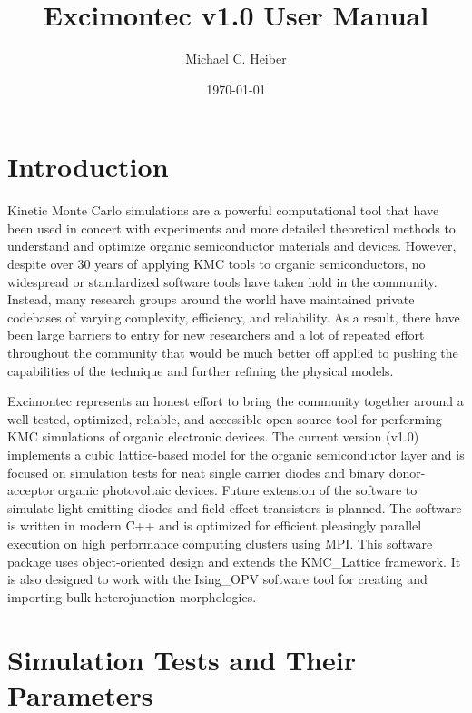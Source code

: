 \documentclass[%
 reprint,onecolumn,notitlepage,
superscriptaddress,longbibliography,
 amsmath,amssymb,
 aps,rmp,floatfix,
]{revtex4-1}
\begin{document}
\title{Excimontec v1.0 User Manual}
\author{Michael C. Heiber}

\date{\today}

\maketitle

\tableofcontents

\newpage

\section{Introduction}

Kinetic Monte Carlo simulations are a powerful computational tool that have been used in concert with experiments and more detailed theoretical methods to understand and optimize organic semiconductor materials and devices.\cite{heiber2019chapter} 
However, despite over 30 years of applying KMC tools to organic semiconductors, no widespread or standardized software tools have taken hold in the community. 
Instead, many research groups around the world have maintained private codebases of varying complexity, efficiency, and reliability. 
As a result, there have been large barriers to entry for new researchers and a lot of repeated effort throughout the community that would be much better off applied to pushing the capabilities of the technique and further refining the physical models.

Excimontec represents an honest effort to bring the community together around a well-tested, optimized, reliable, and accessible open-source tool for performing KMC simulations of organic electronic devices. 
The current version (v1.0) implements a cubic lattice-based model for the organic semiconductor layer and is focused on simulation tests for neat single carrier diodes and binary donor-acceptor organic photovoltaic devices.
Future extension of the software to simulate light emitting diodes and field-effect transistors is planned.
The software is written in modern C++ and is optimized for efficient pleasingly parallel execution on high performance computing clusters using MPI. 
This software package uses object-oriented design and extends the KMC\_Lattice framework.\cite{heiber2019joss} 
It is also designed to work with the Ising\_OPV software tool for creating and importing bulk heterojunction morphologies.\cite{heiber2018joss}

\section{Simulation Tests and Their Parameters}
\end{document}
